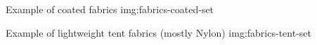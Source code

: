 {Example of coated fabrics}
{img:fabrics-coated-set}

{Example of lightweight tent fabrics (mostly Nylon)}
{img:fabrics-tent-set}
